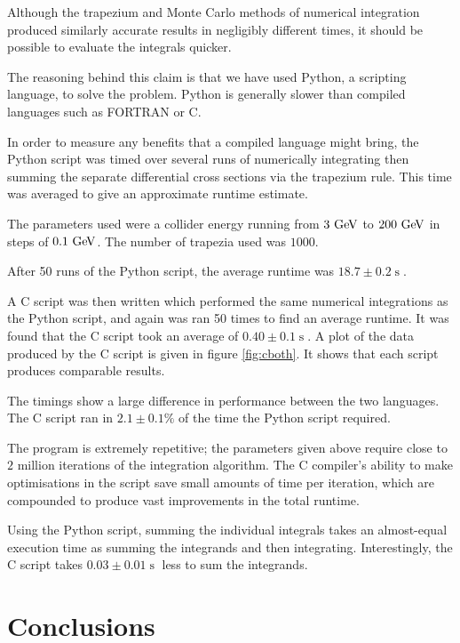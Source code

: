 \documentclass[]{article}
\begin{document}
Although the trapezium and Monte Carlo methods of numerical integration produced similarly accurate results in negligibly different times, it should be possible to evaluate the integrals quicker.

The reasoning behind this claim is that we have used Python, a scripting language, to solve the problem. Python is generally slower than compiled languages such as FORTRAN or C.

In order to measure any benefits that a compiled language might bring, the Python script was timed over several runs of numerically integrating then summing the separate differential cross sections via the trapezium rule. This time was averaged to give an approximate runtime estimate.

The parameters used were a collider energy running from $3\GeV$ to $200\GeV$ in steps of $0.1\GeV$. The number of trapezia used was $1000$.

After 50 runs of the Python script, the average runtime was $18.7 \pm 0.2 \operatorname{s}$.

A C script was then written which performed the same numerical integrations as the Python script, and again was ran 50 times to find an average runtime. It was found that the C script took an average of $0.40 \pm 0.1 \operatorname{s}$. A plot of the data produced by the C script is given in figure \ref{fig:cboth}. It shows that each script produces comparable results.

The timings show a large difference in performance between the two languages. The C script ran in $2.1\pm0.1\%$ of the time the Python script required.

The program is extremely repetitive; the parameters given above require close to $2$ million iterations of the integration algorithm. The C compiler's ability to make optimisations in the script save small amounts of time per iteration, which are compounded to produce vast improvements in the total runtime.

Using the Python script, summing the individual integrals takes an almost-equal execution time as summing the integrands and then integrating. Interestingly, the C script takes $0.03\pm0.01\operatorname{s}$ less to sum the integrands.

\section{Conclusions}\label{sec:conclusion}
\end{document}
